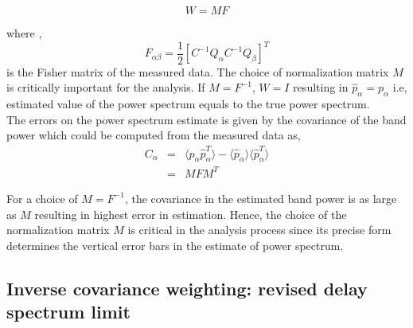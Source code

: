 \documentclass[twocolumn]{emulateapj}
\begin{document}
    \begin{equation}
     W = MF
     \label{eq19}
    \end{equation} 
    
    where , 
    \begin{equation}
     F_{\alpha\beta} = \frac {1} { 2} [C^{-1}Q_{\alpha}C^{-1}Q_{\beta}]^{T}
     \label{eq20}
    \end{equation} 
     is the Fisher matrix of the measured data. The choice of normalization matrix $M$ is critically important for the analysis. If $M = F^{-1}$, $W=I$ resulting in $\hat p_{\alpha} = p_{\alpha}$ i.e, estimated value of the power spectrum equals to the true power spectrum.\\
     The errors on the power spectrum estimate is given by the covariance of the band power which could be computed from the measured data as,  
    \begin{eqnarray}
     C_{\alpha} & = & \langle \hat p_{\alpha} \hat p_{\alpha}^{T} \rangle - \langle \hat p_{\alpha} \rangle \langle \hat p_{\alpha}^{T} \rangle \nonumber\\
     		& = & MFM^{T}
    \label{eq21}
     \end{eqnarray} 
     
     For a choice of $M = F^{-1}$, the covariance in the estimated band power is as large as $M$ resulting in highest error in estimation. Hence, the choice of the normalization matrix $M$ is critical in the analysis process since its precise form determines the vertical error bars in the estimate of power spectrum. 
    
    \subsection{Inverse covariance weighting: revised delay spectrum limit}
    
\end{document}
